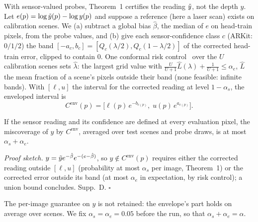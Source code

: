 With sensor-valued probes, Theorem~1 certifies the reading $\tilde{y}$, not the depth $y$.
Let $e(p)=\log\tilde{y}(p)-\log y(p)$ and suppose a reference (here a laser scan) exists on calibration scenes.
We (a) subtract a global bias $\hat\beta$, the median of $e$ on head-train pixels, from the probe values, and (b) give each sensor-confidence class $c$ (ARKit: $0/1/2$) the band $[-a_c,b_c]=[Q_c(\lambda/2),Q_c(1-\lambda/2)]$ of the corrected head-train error, clipped to contain $0$.
One conformal risk control~\cite{angelopoulos2024crc} over the $U$ calibration scenes sets $\hat\lambda$: the largest grid value with $\frac{U}{U+1}\hat L(\lambda)+\frac{1}{U+1}\le\alpha_e$, $\hat L$ the mean fraction of a scene's pixels outside their band (none feasible: infinite bands).
With $[\ell,u]$ the \mDual interval for the corrected reading at level $1-\alpha_s$, the enveloped interval is
\begin{equation}
C^{\text{env}}(p)=\big[\ell(p)\,e^{-b_{c(p)}},\;u(p)\,e^{a_{c(p)}}\big].
\label{eq:envelope}
\end{equation}

\begin{proposition}[Envelope]
\label{prop:env}
If the sensor reading and its confidence are defined at every evaluation pixel, the miscoverage of $y$ by $C^{\text{env}}$, averaged over test scenes and probe draws, is at most $\alpha_s+\alpha_e$.
\end{proposition}

\ifenvelopemain
\noindent\emph{Proof sketch.} $y=\tilde{y} e^{-\hat\beta}e^{-(e-\hat\beta)}$, so $y\notin C^{\text{env}}(p)$ requires either the corrected reading outside $[\ell,u]$ (probability at most $\alpha_s$ per image, Theorem~1) or the corrected error outside its band (at most $\alpha_e$ in expectation, by risk control); a union bound concludes. Supp.~D. \hfill$\square$

\fi
The per-image guarantee on $y$ is not retained: the envelope's part holds on average over scenes.
We fix $\alpha_s=\alpha_e=0.05$ before the run, so that $\alpha_s+\alpha_e=\alpha$.
